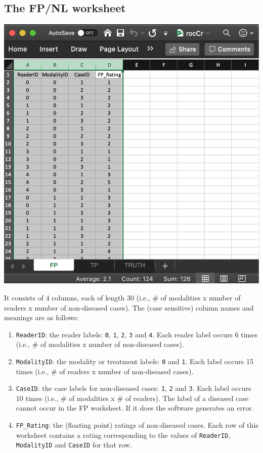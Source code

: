\documentclass[
]{book}
\begin{document}
\hypertarget{quick-start-roc-fp}{%
\subsection{The FP/NL worksheet}\label{quick-start-roc-fp}}

\includegraphics[width=1\textwidth,height=\textheight]{images/quick-start/rocCrFp.png}

It consists of 4 columns, each of length 30 (i.e., \# of modalities x number of readers x number of non-diseased cases). The (case sensitive) column names and meanings are as follows:

\begin{enumerate}
\def\labelenumi{\arabic{enumi}.}
\item
  \texttt{ReaderID}: the reader labels: \texttt{0}, \texttt{1}, \texttt{2}, \texttt{3} and \texttt{4}. Each reader label occurs 6 times (i.e., \# of modalities x number of non-diseased cases).
\item
  \texttt{ModalityID}: the modality or treatment labels: \texttt{0} and \texttt{1}. Each label occurs 15 times (i.e., \# of readers x number of non-diseased cases).
\item
  \texttt{CaseID}: the case labels for non-diseased cases: \texttt{1}, \texttt{2} and \texttt{3}. Each label occurs 10 times (i.e., \# of modalities x \# of readers). The label of a diseased case cannot occur in the FP worksheet. If it does the software generates an error.
\item
  \texttt{FP\_Rating}: the (floating point) ratings of non-diseased cases. Each row of this worksheet contains a rating corresponding to the values of \texttt{ReaderID}, \texttt{ModalityID} and \texttt{CaseID} for that row.
\end{enumerate}
\end{document}
